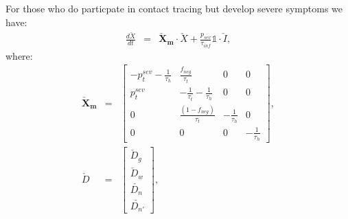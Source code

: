 \documentclass[notitlepage, superscriptaddress]{revtex4-2}
\begin{document}
For those who do particpate in contact tracing but develop severe symptoms we have:
\begin{eqnarray}
\frac{d\check{X}}{dt} &=& \boldsymbol{\check{X}_{m}} \cdot  \check{X} + \frac{p_{sev}}{\tau_{inf}} \mathbb{1} \cdot  \check{I}, 
\end{eqnarray}
where:
%
\begin{eqnarray}
\boldsymbol{\check{X}_{m}} &=&
\begin{bmatrix}
- p^{sev}_{t}   - \frac{1}{\tau_{h}}      &  \frac{f_{neg}}{\tau_{t}}    & 0  & 0\\
p^{sev}_{t}                  &  -\frac{1}{\tau_{t}}  - \frac{1}{\tau_{h}}  & 0 & 0\\
0 & \frac{(1-f_{neg})}{\tau_{t}}  &  -  \frac{1}{\tau_{h}} & 0 \\ 
0 & 0 & 0 &  -  \frac{1}{\tau_{h}}
\end{bmatrix}, \\ 
%
\check{D} &=& 
\begin{bmatrix}
\check{D}_{g} \\  \check{D}_{w}\\ \check{D_{n}} \\ \check{D_{n'}}
\end{bmatrix}, \\ 
%
\end{eqnarray}





\end{document}
